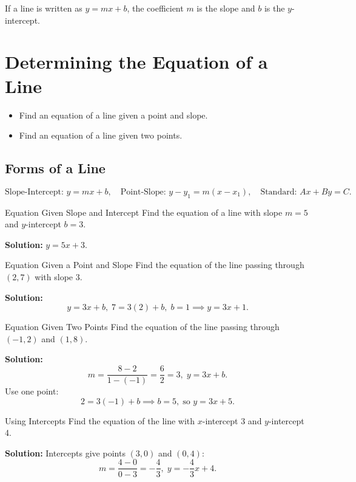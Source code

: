 If a line is written as \(y=mx+b\), the coefficient \(m\) is the slope and \(b\) is the $y$-intercept.

\section{Determining the Equation of a Line}
\begin{outcome}
\begin{itemize}
\item Find an equation of a line given a point and slope.
\item Find an equation of a line given two points.
\end{itemize}
\end{outcome}

\subsection*{Forms of a Line}
\[
\text{Slope-Intercept: }y=mx+b,\quad \text{Point-Slope: }y-y_1=m(x-x_1),\quad \text{Standard: }Ax+By=C.
\]

\begin{example}{Equation Given Slope and Intercept}\label{exa:eq-slope-int}
Find the equation of a line with slope \(m=5\) and $y$-intercept \(b=3\).

\textbf{Solution:} \(y=5x+3.\)
\end{example}

\begin{example}{Equation Given a Point and Slope}\label{exa:eq-point-slope}
Find the equation of the line passing through \((2,7)\) with slope \(3\).

\textbf{Solution:}
\[
y=3x+b,\; 7=3(2)+b,\; b=1 \implies y=3x+1.
\]
\end{example}

\begin{example}{Equation Given Two Points}\label{exa:eq-two-points}
Find the equation of the line passing through \((-1,2)\) and \((1,8)\).

\textbf{Solution:}
\[
m=\frac{8-2}{1-(-1)}=\frac{6}{2}=3,\; y=3x+b.
\]
Use one point:
\[
2=3(-1)+b \implies b=5,\; \text{so } y=3x+5.
\]
\end{example}

\begin{example}{Using Intercepts}\label{exa:eq-from-intercepts}
Find the equation of the line with $x$-intercept 3 and $y$-intercept 4.

\textbf{Solution:} Intercepts give points $(3,0)$ and $(0,4)$:
\[
m=\frac{4-0}{0-3}=-\frac{4}{3},\;y=-\frac{4}{3}x+4.
\]
\end{example}

